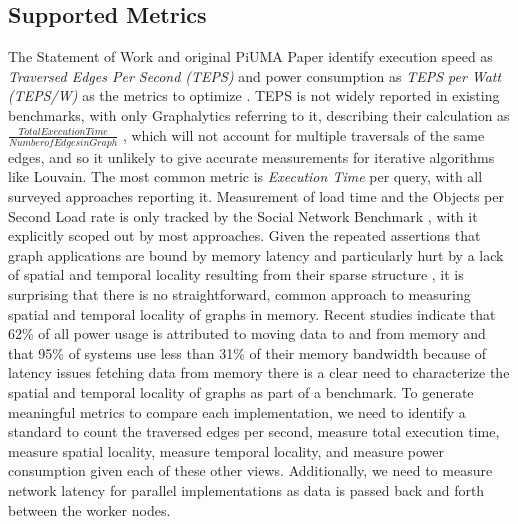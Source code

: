 \documentclass[letterpaper, 10pt]{article}
\begin{document}
\begin{multicols}{2}
{        \subsection{Supported Metrics}\label{section:metrics}
        The Statement of Work and original PiUMA Paper identify execution speed as \textit{Traversed Edges Per Second (TEPS)} and power consumption as \textit{TEPS per Watt (TEPS/W)} as the metrics to optimize \cite{Aananthakrishnan2020}. 
        TEPS is not widely reported in existing benchmarks, with only Graphalytics referring to it, describing their calculation as $\frac{Total Execution Time}{Number of Edges in Graph}$ \cite{Capota2015}, which will not account for multiple traversals of the same edges, and so it unlikely to give accurate measurements for iterative algorithms like Louvain.
        The most common metric is \textit{Execution Time} per query, with all surveyed approaches reporting it. 
        Measurement of load time and the Objects per Second Load rate is only tracked by the Social Network Benchmark \cite{Angles2013}, with it explicitly scoped out by most approaches. 
        Given the repeated assertions that graph applications are bound by memory latency and particularly hurt by a lack of spatial and temporal locality resulting from their sparse structure \cite{Mutlu2023, Ren2010, Blondel2008, Capota2015, Beamer2017}, it is surprising that there is no straightforward, common approach to measuring spatial and temporal locality of graphs in memory.
        Recent studies indicate that 62\% of all power usage is attributed to moving data to and from memory \cite{Mutlu2023} and that 95\% of systems use less than 31\% of their memory bandwidth \cite{Kanev2015} because of latency issues fetching data from memory there is a clear need to characterize the spatial and temporal locality of graphs as part of a benchmark. 
        To generate meaningful metrics to compare each implementation, we need to identify a standard to count the traversed edges per second, measure total execution time, measure spatial locality, measure temporal locality, and measure power consumption given each of these other views.
        Additionally, we need to measure network latency for parallel implementations as data is passed back and forth between the worker nodes. 

}
\end{multicols}
\end{document}
